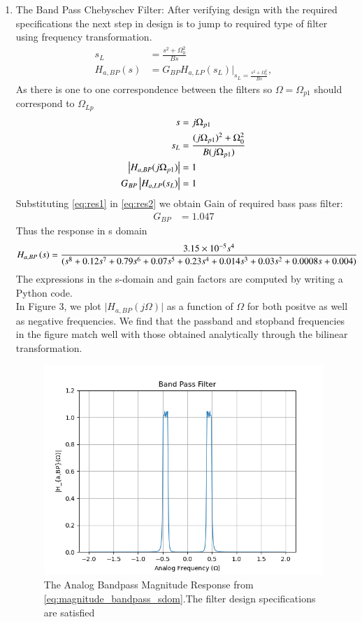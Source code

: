 \documentclass{article}
\begin{document}
\begin{enumerate}
\item {The Band Pass Chebyschev Filter:} 
After verifying design with the required specifications the next step in design is to jump to required type of filter using frequency transformation. 
\begin{align}
    s_L &= \frac{s^2 + \Omega_0^2}{Bs} \\
    H_{a,BP}(s) &= G_{BP}H_{a,LP}(s_L)\vert_{s_L = \frac{s^2 + \Omega_0^2}{Bs}},
\end{align}
As there is one to one correspondence between the filters so $\Omega=\Omega_{p1}$ should correspond to $\Omega_{Lp}$
\begin{align}
    s &= j\Omega_{p1}\\
    s_{L} &= \frac{(j\Omega_{p1})^2 + \Omega_0^2}{B(j\Omega_{p1})} \label{eq:res1} \\ 
    \left\vert H_{a,BP}(j\Omega_{p1})\right\vert &= 1 \\
    G_{BP}\left\vert H_{a,LP}(s_L)\right\vert &= 1 \label{eq:res2}
\end{align}
Substituting \eqref{eq:res1} in \eqref{eq:res2} we obtain Gain of required bass pass filter:
\begin{align}
    G_{BP} &= 1.047 
\end{align}
Thus the response in s domain 
\begin{align}
    H_{a,BP}\left(s\right) &= \frac{3.15\times 10^{-5}s^4}{(s^8 + 0.12s^7 + 0.79s^6 + 0.07s^5 + 0.23s^4 + 0.014s^3 + 0.03s^2 + 0.0008s + 0.004)}
 \label{eq:magnitude_bandpass_sdom}
\end{align}
The expressions in the s-domain and gain factors are computed by writing a Python code. \\
In Figure 3, we plot $\vert H_{a,BP}(j\Omega)\vert$ as a function of $\Omega$ for both positve as
well as negative frequencies.  We find that the passband and stopband frequencies in the figure
match well with those obtained analytically through the bilinear transformation.
\begin{figure}[H]
\centering
\includegraphics[width=1\columnwidth]{figs/4.png}
\caption{The Analog Bandpass Magnitude Response from \eqref{eq:magnitude_bandpass_sdom}.The filter design specifications are satisfied}
\label{fig:band_pass_filter}
\end{figure}


\end{enumerate}
\end{document}
